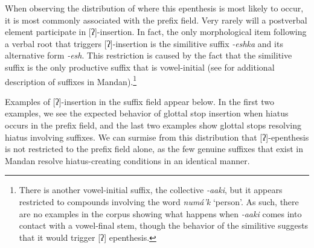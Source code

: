 When observing the distribution of where this epenthesis is most likely to occur, it is most commonly associated with the prefix field. Very rarely will a postverbal element participate in [ʔ]-insertion. In fact, the only morphological item following a verbal root that triggers [ʔ]-insertion is the similitive suffix \textit{-eshka} and its alternative form \textit{-esh}. This restriction is caused by the fact that the similitive suffix is the only productive suffix that is vowel-initial (see  for additional description of suffixes in Mandan).\footnote{There is another vowel-initial suffix, the collective \textit{-aaki}, but it appears restricted to compounds involving the word \textit{numá'k} `person'. As such, there are no examples in the corpus showing what happens when \textit{-aaki} comes into contact with a vowel-final stem, though the behavior of the similitive suggests that it would trigger [ʔ] epenthesis.}

Examples of [ʔ]-insertion in the suffix field appear below. In the first two examples, we see the expected behavior of glottal stop insertion when hiatus occurs in the prefix field, and the last two examples show glottal stops resolving hiatus involving suffixes. We can surmise from this distribution that [ʔ]-epenthesis is not restricted to the prefix field alone, as the few genuine suffixes that exist in Mandan resolve hiatus-creating conditions in an identical manner.

